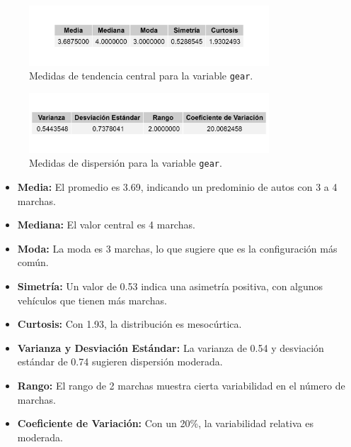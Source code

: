 \documentclass{article}
\begin{document}
\begin{enumerate}
	      \begin{figure}[H]
		      \centering
		      \includegraphics[width=0.8\textwidth]{MTC/gear_central.png}
		      \caption{Medidas de tendencia central para la variable \texttt{gear}.}
		      \label{fig:gear_central}
	      \end{figure}

	      \begin{figure}[H]
		      \centering
		      \includegraphics[width=0.8\textwidth]{MTC/gear_dispersion.png}
		      \caption{Medidas de dispersión para la variable \texttt{gear}.}
		      \label{fig:gear_dispersion}
	      \end{figure}
	      
	      \begin{itemize}
		      \item \textbf{Media:} El promedio es 3.69, indicando un predominio de autos con 3 a 4 marchas.
		      \item \textbf{Mediana:} El valor central es 4 marchas.
		      \item \textbf{Moda:} La moda es 3 marchas, lo que sugiere que es la configuración más común.
		      \item \textbf{Simetría:} Un valor de 0.53 indica una asimetría positiva, con algunos vehículos que tienen más marchas.
		      \item \textbf{Curtosis:} Con 1.93, la distribución es mesocúrtica.
		      \item \textbf{Varianza y Desviación Estándar:} La varianza de 0.54 y desviación estándar de 0.74 sugieren dispersión moderada.
		      \item \textbf{Rango:} El rango de 2 marchas muestra cierta variabilidad en el número de marchas.
		      \item \textbf{Coeficiente de Variación:} Con un 20\%, la variabilidad relativa es moderada.
	      \end{itemize}


\end{enumerate}
\end{document}
